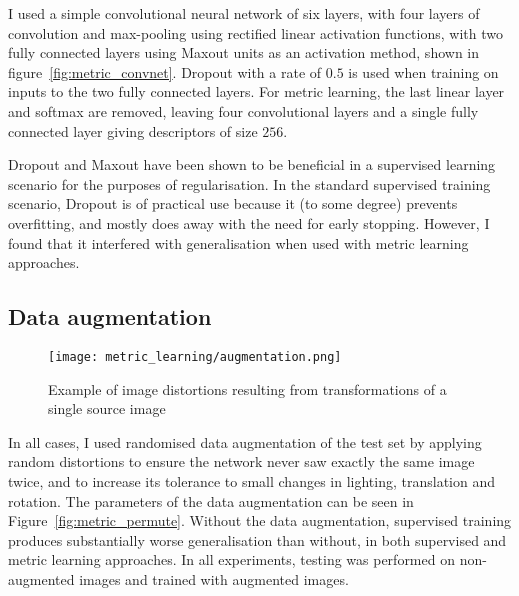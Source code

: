 I used a simple convolutional neural network of six layers, with four layers of convolution and max-pooling using rectified linear activation functions, with two fully connected layers using Maxout \cite{Springenberg2013} units as an activation method, shown in figure~\ref{fig:metric_convnet}. Dropout \cite{HintonDropout} with a rate of $ 0.5 $ is used when training on inputs to the two fully connected layers. For metric learning, the last linear layer and softmax are removed, leaving four convolutional layers and a single fully connected layer giving descriptors of size $ 256 $.

Dropout and Maxout have been shown to be beneficial in a supervised learning scenario for the purposes of regularisation. In the standard supervised training scenario, Dropout is of practical use because it (to some degree) prevents overfitting, and mostly does away with the need for early stopping. However, I found that it interfered with generalisation when used with metric learning approaches.

\subsection {Data augmentation}

\begin{figure}[h]
\centering
\texttt{[image: metric\_learning/augmentation.png]}
\caption{Example of image distortions resulting from transformations of a single source image}
\label{fig:metric_augmentation}
\end{figure}


In all cases, I used randomised data augmentation of the test set by applying random distortions to ensure the network never saw exactly the same image twice, and to increase its tolerance to small changes in lighting, translation and rotation. The parameters of the data augmentation can be seen in Figure~\ref{fig:metric_permute}. Without the data augmentation, supervised training produces substantially worse generalisation than without, in both supervised and metric learning approaches. In all experiments, testing was performed on non-augmented images and trained with augmented images.

